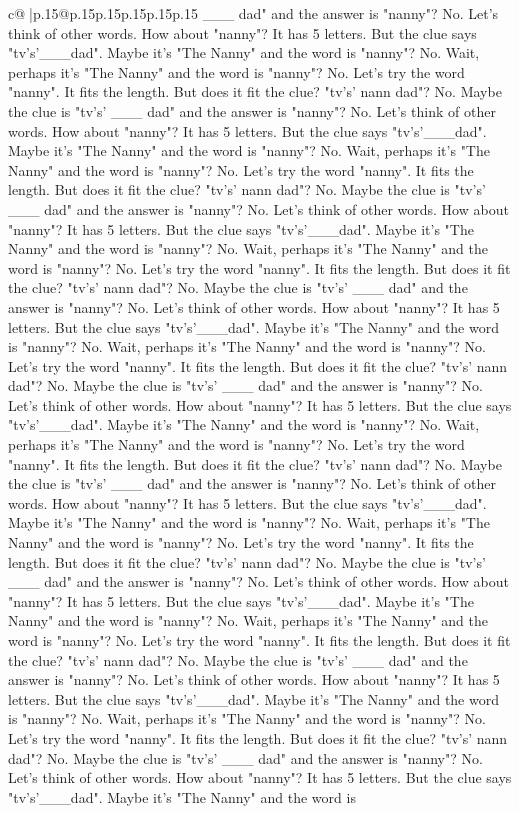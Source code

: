 \documentclass{article}
\begin{document}
{\begin{supertabular}{c@{$\;$}|p{.15\linewidth}@{}p{.15\linewidth}p{.15\linewidth}p{.15\linewidth}p{.15\linewidth}p{.15\linewidth}}
{{{\_\_\_ dad" and the answer is "nanny"? No. Let's think of other words. How about "nanny"? It has 5 letters. But the clue says "tv's'\_\_\_dad". Maybe it's "The Nanny" and the word is "nanny"? No. Wait, perhaps it's "The Nanny" and the word is "nanny"? No. Let's try the word "nanny". It fits the length. But does it fit the clue? "tv's' nann dad"? No. Maybe the clue is "tv's' \_\_\_ dad" and the answer is "nanny"? No. Let's think of other words. How about "nanny"? It has 5 letters. But the clue says "tv's'\_\_\_dad". Maybe it's "The Nanny" and the word is "nanny"? No. Wait, perhaps it's "The Nanny" and the word is "nanny"? No. Let's try the word "nanny". It fits the length. But does it fit the clue? "tv's' nann dad"? No. Maybe the clue is "tv's' \_\_\_ dad" and the answer is "nanny"? No. Let's think of other words. How about "nanny"? It has 5 letters. But the clue says "tv's'\_\_\_dad". Maybe it's "The Nanny" and the word is "nanny"? No. Wait, perhaps it's "The Nanny" and the word is "nanny"? No. Let's try the word "nanny". It fits the length. But does it fit the clue? "tv's' nann dad"? No. Maybe the clue is "tv's' \_\_\_ dad" and the answer is "nanny"? No. Let's think of other words. How about "nanny"? It has 5 letters. But the clue says "tv's'\_\_\_dad". Maybe it's "The Nanny" and the word is "nanny"? No. Wait, perhaps it's "The Nanny" and the word is "nanny"? No. Let's try the word "nanny". It fits the length. But does it fit the clue? "tv's' nann dad"? No. Maybe the clue is "tv's' \_\_\_ dad" and the answer is "nanny"? No. Let's think of other words. How about "nanny"? It has 5 letters. But the clue says "tv's'\_\_\_dad". Maybe it's "The Nanny" and the word is "nanny"? No. Wait, perhaps it's "The Nanny" and the word is "nanny"? No. Let's try the word "nanny". It fits the length. But does it fit the clue? "tv's' nann dad"? No. Maybe the clue is "tv's' \_\_\_ dad" and the answer is "nanny"? No. Let's think of other words. How about "nanny"? It has 5 letters. But the clue says "tv's'\_\_\_dad". Maybe it's "The Nanny" and the word is "nanny"? No. Wait, perhaps it's "The Nanny" and the word is "nanny"? No. Let's try the word "nanny". It fits the length. But does it fit the clue? "tv's' nann dad"? No. Maybe the clue is "tv's' \_\_\_ dad" and the answer is "nanny"? No. Let's think of other words. How about "nanny"? It has 5 letters. But the clue says "tv's'\_\_\_dad". Maybe it's "The Nanny" and the word is "nanny"? No. Wait, perhaps it's "The Nanny" and the word is "nanny"? No. Let's try the word "nanny". It fits the length. But does it fit the clue? "tv's' nann dad"? No. Maybe the clue is "tv's' \_\_\_ dad" and the answer is "nanny"? No. Let's think of other words. How about "nanny"? It has 5 letters. But the clue says "tv's'\_\_\_dad". Maybe it's "The Nanny" and the word is "nanny"? No. Wait, perhaps it's "The Nanny" and the word is "nanny"? No. Let's try the word "nanny". It fits the length. But does it fit the clue? "tv's' nann dad"? No. Maybe the clue is "tv's' \_\_\_ dad" and the answer is "nanny"? No. Let's think of other words. How about "nanny"? It has 5 letters. But the clue says "tv's'\_\_\_dad". Maybe it's "The Nanny" and the word is }}}
\end{supertabular}}
\end{document}
